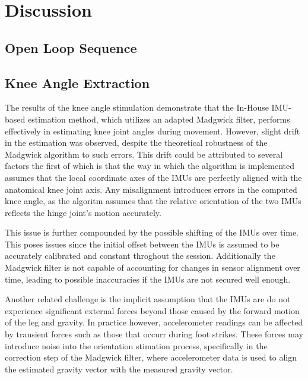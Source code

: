 

\section{Discussion}
\subsection{Open Loop Sequence}

\subsection{Knee Angle Extraction}

The results of the knee angle stimulation demonstrate that the In-House IMU-based estimation method, which utilizes an adapted Madgwick filter, performs effectively in estimating knee joint angles during movement. However, slight drift in the estimation was observed, despite the theoretical robustness of the Madgwick algorithm to such errors. This drift could be attributed to several factors the first of which is that the way in which the algorithm is implemented assumes that the local coordinate axes of the IMUs are perfectly aligned with the anatomical knee joint axis. Any misalignment introduces errors in the computed knee angle, as the algoritm assumes that the relative orientation of the two IMUs reflects the hinge joint's motion accurately.


This issue is further compounded by the possible shifting of the IMUs over time. This poses issues since the initial offset between the IMUs is assumed to be accurately calibrated and constant throghout the session. Additionally the Madgwick filter is not capable of accounting for changes in sensor alignment over time, leading to possible inaccuracies if the IMUs are not secured well enough.

Another related challenge is the implicit assumption that the IMUs are do not experience significant external forces beyond those caused by the forward motion of the leg and gravity. In practice however, accelerometer readings can be affected by transient forces such as those that occurr during foot strikes. These forces may introduce noise into the orientation stimation process, specifically in the correction step of the Madgwick filter, where accelerometer data is used to align the estimated gravity vector with the measured gravity vector.


